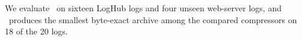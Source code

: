 We evaluate \tool\ on sixteen LogHub logs and four unseen web-server logs, and \tool\ produces the smallest byte-exact archive among the compared compressors on 18 of the 20 logs.
